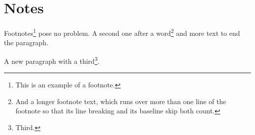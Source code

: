 \documentclass{article}
\begin{document}
\section{Notes}
Footnotes\footnote{This is an example of a footnote.}
pose no problem. A second one after a word\footnote{And a longer footnote text, which runs over more than one line of the footnote so that its line breaking and its baseline skip both count.} and more text to end the paragraph.

A new paragraph with a third\footnote{Third.}.
\end{document}
